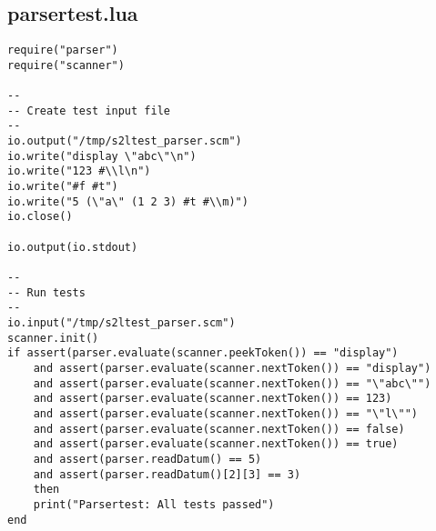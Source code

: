 \subsection{parsertest.lua}
\begin{verbatim}
require("parser")
require("scanner")

--
-- Create test input file
--
io.output("/tmp/s2ltest_parser.scm")
io.write("display \"abc\"\n")
io.write("123 #\\l\n")
io.write("#f #t")
io.write("5 (\"a\" (1 2 3) #t #\\m)")
io.close()

io.output(io.stdout)

--
-- Run tests
--
io.input("/tmp/s2ltest_parser.scm")
scanner.init()
if assert(parser.evaluate(scanner.peekToken()) == "display") 
    and assert(parser.evaluate(scanner.nextToken()) == "display") 
    and assert(parser.evaluate(scanner.nextToken()) == "\"abc\"") 
    and assert(parser.evaluate(scanner.nextToken()) == 123) 
    and assert(parser.evaluate(scanner.nextToken()) == "\"l\"") 
    and assert(parser.evaluate(scanner.nextToken()) == false) 
    and assert(parser.evaluate(scanner.nextToken()) == true) 
    and assert(parser.readDatum() == 5) 
    and assert(parser.readDatum()[2][3] == 3) 
    then
    print("Parsertest: All tests passed")
end
\end{verbatim}
